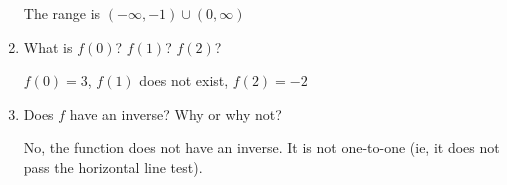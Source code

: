 \documentclass[handout,nooutcomes]{ximera}
\begin{document}
\begin{problem}
\begin{enumerate}
			 \begin{freeResponse}			 
			 The range is $(-\infty ,-1) \cup (0,\infty )$
			 \end{freeResponse}
			 
			 \item What is $f(0)$?  $f(1)$?  $f(2)$?
			 
			  \begin{freeResponse}			 
			 $f(0)=3$, $f(1)$ does not exist, $f(2)=-2$
			 \end{freeResponse}
			 
			 \item Does $f$ have an inverse?  Why or why not?
			 
			  \begin{freeResponse}			 
			 No, the function does not have an inverse.  It is not one-to-one (ie, it does not pass the horizontal line test).
			 \end{freeResponse}
			
			\end{enumerate}
			
	\end{problem}
	
\end{document}
